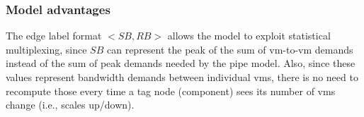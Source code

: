 \subsubsection{Model advantages}
The edge label format $<SB, RB>$ allows the model to exploit statistical multiplexing, since $SB$ can represent the peak of the sum of \gls{vm}-to-\gls{vm} demands instead of the sum of peak demands needed by the pipe model.
Also, since these values represent bandwidth demands between individual \glspl{vm}, there is no need to recompute those every time a \gls{tag} node (component) sees its number of \glspl{vm} change (i.e., scales up/down). 

